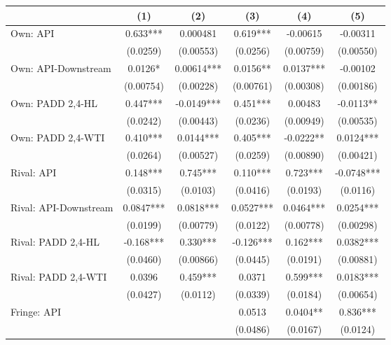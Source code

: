 {
\def\sym#1{\ifmmode^{#1}\else\(^{#1}\)\fi}
\begin{tabular}{l*{5}{c}}
\toprule
                &\multicolumn{1}{c}{(1)}   &\multicolumn{1}{c}{(2)}   &\multicolumn{1}{c}{(3)}   &\multicolumn{1}{c}{(4)}   &\multicolumn{1}{c}{(5)}   \\
\midrule
Own: API        &    0.633***& 0.000481   &    0.619***& -0.00615   & -0.00311   \\
                & (0.0259)   &(0.00553)   & (0.0256)   &(0.00759)   &(0.00550)   \\
\addlinespace
Own: API-Downstream&   0.0126*  &  0.00614***&   0.0156** &   0.0137***& -0.00102   \\
                &(0.00754)   &(0.00228)   &(0.00761)   &(0.00308)   &(0.00186)   \\
\addlinespace
Own: PADD 2,4-HL&    0.447***&  -0.0149***&    0.451***&  0.00483   &  -0.0113** \\
                & (0.0242)   &(0.00443)   & (0.0236)   &(0.00949)   &(0.00535)   \\
\addlinespace
Own: PADD 2,4-WTI&    0.410***&   0.0144***&    0.405***&  -0.0222** &   0.0124***\\
                & (0.0264)   &(0.00527)   & (0.0259)   &(0.00890)   &(0.00421)   \\
\addlinespace
Rival: API      &    0.148***&    0.745***&    0.110***&    0.723***&  -0.0748***\\
                & (0.0315)   & (0.0103)   & (0.0416)   & (0.0193)   & (0.0116)   \\
\addlinespace
Rival: API-Downstream&   0.0847***&   0.0818***&   0.0527***&   0.0464***&   0.0254***\\
                & (0.0199)   &(0.00779)   & (0.0122)   &(0.00778)   &(0.00298)   \\
\addlinespace
Rival: PADD 2,4-HL&   -0.168***&    0.330***&   -0.126***&    0.162***&   0.0382***\\
                & (0.0460)   &(0.00866)   & (0.0445)   & (0.0191)   &(0.00881)   \\
\addlinespace
Rival: PADD 2,4-WTI&   0.0396   &    0.459***&   0.0371   &    0.599***&   0.0183***\\
                & (0.0427)   & (0.0112)   & (0.0339)   & (0.0184)   &(0.00654)   \\
\addlinespace
Fringe: API     &            &            &   0.0513   &   0.0404** &    0.836***\\
                &            &            & (0.0486)   & (0.0167)   & (0.0124)   \\

\end{tabular}}
